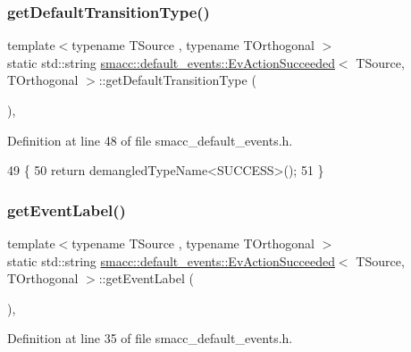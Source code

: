 \subsubsection{\texorpdfstring{get\+Default\+Transition\+Type()}{getDefaultTransitionType()}}
{\footnotesize\ttfamily template$<$typename T\+Source , typename T\+Orthogonal $>$ \\
static std\+::string \hyperlink{structsmacc_1_1default__events_1_1EvActionSucceeded}{smacc\+::default\+\_\+events\+::\+Ev\+Action\+Succeeded}$<$ T\+Source, T\+Orthogonal $>$\+::get\+Default\+Transition\+Type (\begin{DoxyParamCaption}{ }\end{DoxyParamCaption})\hspace{0.3cm}{\ttfamily [inline]}, {\ttfamily [static]}}



Definition at line 48 of file smacc\+\_\+default\+\_\+events.\+h.


\begin{DoxyCode}
49   \{
50     \textcolor{keywordflow}{return} demangledTypeName<SUCCESS>();
51   \}
\end{DoxyCode}
\mbox{\label{structsmacc_1_1default__events_1_1EvActionSucceeded_a5ff4f33c0c4a1cc704a804ff6aa2692d}} 
\subsubsection{\texorpdfstring{get\+Event\+Label()}{getEventLabel()}}
{\footnotesize\ttfamily template$<$typename T\+Source , typename T\+Orthogonal $>$ \\
static std\+::string \hyperlink{structsmacc_1_1default__events_1_1EvActionSucceeded}{smacc\+::default\+\_\+events\+::\+Ev\+Action\+Succeeded}$<$ T\+Source, T\+Orthogonal $>$\+::get\+Event\+Label (\begin{DoxyParamCaption}{ }\end{DoxyParamCaption})\hspace{0.3cm}{\ttfamily [inline]}, {\ttfamily [static]}}



Definition at line 35 of file smacc\+\_\+default\+\_\+events.\+h.


